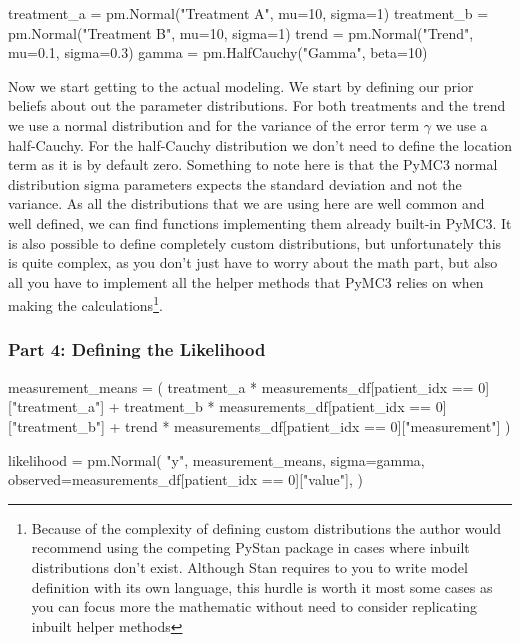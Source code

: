 \documentclass[12pt,a4paper,leqno]{report}
\theoremstyle{plain}
\theoremstyle{definition}
\theoremstyle{remark}
\begin{document}
\bigskip
\begin{pyverbatim}[][fontsize=\footnotesize]
    treatment_a = pm.Normal("Treatment A", mu=10, sigma=1)
    treatment_b = pm.Normal("Treatment B", mu=10, sigma=1)
    trend = pm.Normal("Trend", mu=0.1, sigma=0.3)
    gamma = pm.HalfCauchy("Gamma", beta=10)
\end{pyverbatim}
\smallskip

Now we start getting to the actual modeling. We start by defining our prior beliefs about
out the parameter distributions. For both treatments and the trend we use a normal distribution and
for the variance of the error term \(\gamma \) we use a half-Cauchy. For the half-Cauchy
distribution we don't need to define the location term as it is by default zero.
Something to note here is that the PyMC3 normal distribution sigma
parameters expects the standard deviation and not the variance. As all the distributions
that we are using here are well common and well defined, we can find functions implementing
them already built-in PyMC3. It is also possible to define completely custom
distributions, but unfortunately this is quite complex, as you don't just have to worry
about the math part, but also all you have to implement all the helper methods that PyMC3
relies on when making the calculations\footnote{Because of the complexity of defining
custom distributions the author would recommend using the competing PyStan package in
cases where inbuilt distributions don't exist. Although Stan requires to you to write
model definition with its own language, this hurdle is worth it most some cases as you can focus
more the mathematic without need to consider replicating inbuilt helper methods}.

\subsubsection*{Part 4: Defining the Likelihood}

\bigskip
\begin{pyverbatim}[][fontsize=\footnotesize]
    measurement_means = (
        treatment_a
        * measurements_df[patient_idx == 0]["treatment_a"]
        + treatment_b
        * measurements_df[patient_idx == 0]["treatment_b"]
        + trend
        * measurements_df[patient_idx == 0]["measurement"]
    )

    likelihood = pm.Normal(
        "y",
        measurement_means,
        sigma=gamma,
        observed=measurements_df[patient_idx == 0]["value"],
    )
\end{pyverbatim}
\smallskip
\end{document}
